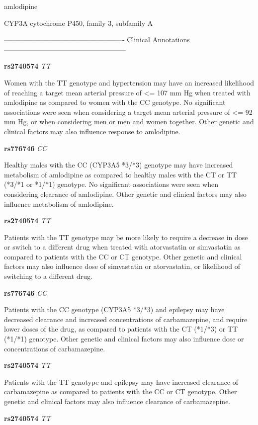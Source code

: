 \documentclass{resume} %
\begin{document}
\begin{rSection}{ amlodipine }
\begin{rSubsection}{ CYP3A }{ cytochrome P450, family 3, subfamily A }{}{}
\item[]

\item[] ---------------------------------------------------- Clinical Annotations -----------------------------------------------------\newline
\item \textbf{ rs2740574 } \textit{ TT }
\item[] Women with the TT genotype and hypertension may have an increased likelihood of reaching a target mean arterial pressure of <= 107 mm Hg when treated with amlodipine as compared to women with the CC genotype. No significant associations were seen when considering a target mean arterial pressure of <= 92 mm Hg, or when considering men or men and women together. Other genetic and clinical factors may also influence response to amlodipine.\item \textbf{ rs776746 } \textit{ CC }
\item[] Healthy males with the CC (CYP3A5 *3/*3) genotype may have increased metabolism of amlodipine as compared to healthy males with the CT or TT (*3/*1 or *1/*1) genotype. No significant associations were seen when considering clearance of amlodipine. Other genetic and clinical factors may also influence metabolism of amlodipine.\item \textbf{ rs2740574 } \textit{ TT }
\item[] Patients with the TT genotype may be more likely to require a decrease in dose or switch to a different drug when treated with atorvastatin or simvastatin as compared to patients with the CC or CT genotype. Other genetic and clinical factors may also influence dose of simvastatin or atorvastatin, or likelihood of switching to a different drug.\item \textbf{ rs776746 } \textit{ CC }
\item[] Patients with the CC genotype (CYP3A5 *3/*3) and epilepsy may have decreased clearance and increased concentrations of carbamazepine, and require lower doses of the drug, as compared to patients with the CT (*1/*3) or TT (*1/*1) genotype. Other genetic and clinical factors may also influence dose or concentrations of carbamazepine.\item \textbf{ rs2740574 } \textit{ TT }
\item[] Patients with the TT genotype and epilepsy may have increased clearance of carbamazepine as compared to patients with the CC or CT genotype. Other genetic and clinical factors may also influence clearance of carbamazepine.\item \textbf{ rs2740574 } \textit{ TT }

\end{rSubsection}
\end{rSection}
\end{document}
